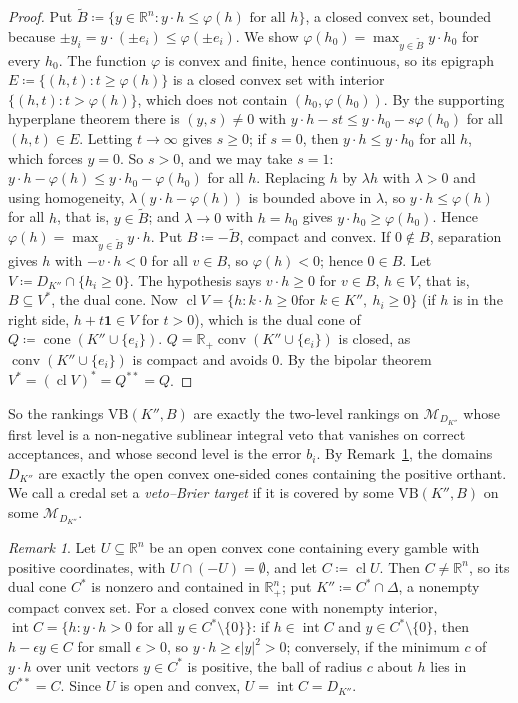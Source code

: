 \documentclass[11pt]{article}
\newcommand{\R}{\mathbb{R}}
\newcommand{\one}{\mathbf{1}}
\newcommand{\M}{\mathcal{M}}
\newcommand{\VB}{\mathrm{VB}}
\DeclareMathOperator{\conv}{conv}
\DeclareMathOperator{\cone}{cone}
\DeclareMathOperator{\cl}{cl}
\DeclareMathOperator{\inter}{int}
\theoremstyle{plain}
\theoremstyle{definition}
\theoremstyle{remark}
\newtheorem{remark}[theorem]{Remark}
\begin{document}
\begin{proof}
Put $\tilde B\coloneqq\{y\in\R^n:y\cdot h\le\varphi(h)\text{ for all }h\}$, a closed
convex set, bounded because $\pm y_i=y\cdot(\pm e_i)\le\varphi(\pm e_i)$. We show
$\varphi(h_0)=\max_{y\in\tilde B}y\cdot h_0$ for every $h_0$. The function $\varphi$ is
convex and finite, hence continuous, so its epigraph $E\coloneqq\{(h,t):t\ge\varphi(h)\}$
is a closed convex set with interior $\{(h,t):t>\varphi(h)\}$, which does not contain
$(h_0,\varphi(h_0))$. By the supporting hyperplane theorem \cite[Thm.~11.6]{Rockafellar}
there is $(y,s)\ne0$ with $y\cdot h-st\le y\cdot h_0-s\varphi(h_0)$ for all $(h,t)\in E$.
Letting $t\to\infty$ gives $s\ge0$; if $s=0$, then $y\cdot h\le y\cdot h_0$ for all $h$,
which forces $y=0$. So $s>0$, and we may take $s=1$: $y\cdot h-\varphi(h)\le y\cdot
h_0-\varphi(h_0)$ for all $h$. Replacing $h$ by $\lambda h$ with $\lambda>0$ and using
homogeneity, $\lambda(y\cdot h-\varphi(h))$ is bounded above in $\lambda$, so $y\cdot
h\le\varphi(h)$ for all $h$, that is, $y\in\tilde B$; and $\lambda\to0$ with $h=h_0$
gives $y\cdot h_0\ge\varphi(h_0)$. Hence $\varphi(h)=\max_{y\in\tilde B}y\cdot h$.
Put $B\coloneqq-\tilde B$, compact and convex. If $0\notin B$, separation
gives $h$ with $-v\cdot h<0$ for all $v\in B$, so $\varphi(h)<0$; hence $0\in B$. Let
$V\coloneqq D_{K''}\cap\{h_i\ge0\}$. The hypothesis says $v\cdot h\ge0$ for $v\in B$,
$h\in V$, that is, $B\subseteq V^\ast$, the dual cone. Now $\cl V=\{h:k\cdot h\ge0\text{
for }k\in K'',\ h_i\ge0\}$ (if $h$ is in the right side, $h+t\one\in V$ for $t>0$), which
is the dual cone of $Q\coloneqq\cone(K''\cup\{e_i\})$. $Q=\R_+\conv(K''\cup\{e_i\})$ is
closed, as $\conv(K''\cup\{e_i\})$ is compact and avoids $0$. By the bipolar theorem
$V^\ast=(\cl V)^\ast=Q^{\ast\ast}=Q$.
\end{proof}

So the rankings $\VB(K'',B)$ are exactly the two-level rankings on $\M_{D_{K''}}$ whose
first level is a non-negative sublinear integral veto that vanishes on correct
acceptances, and whose second level is the error $b_i$. By Remark~\ref{rem:convexU}, the
domains $D_{K''}$ are exactly the open convex one-sided cones containing the positive
orthant. We call a credal set a \emph{veto--Brier target} if it is covered by some
$\VB(K'',B)$ on some $\M_{D_{K''}}$.

\begin{remark}\label{rem:convexU}
Let $U\subseteq\R^n$ be an open convex cone containing every gamble with positive
coordinates, with $U\cap(-U)=\emptyset$, and let $C\coloneqq\cl U$. Then $C\neq\R^n$, so
its dual cone $C^\ast$ is nonzero and contained in $\R^n_+$; put $K''\coloneqq C^\ast\cap
\Delta$, a nonempty compact convex set. For a closed convex cone with nonempty interior,
$\inter C=\{h:y\cdot h>0\text{ for all }y\in C^\ast\setminus\{0\}\}$: if $h\in\inter C$ and
$y\in C^\ast\setminus\{0\}$, then $h-\epsilon y\in C$ for small $\epsilon>0$, so $y\cdot
h\ge\epsilon|y|^2>0$; conversely, if the minimum $c$ of $y\cdot h$ over unit vectors $y\in
C^\ast$ is positive, the ball of radius $c$ about $h$ lies in $C^{\ast\ast}=C$. Since $U$
is open and convex, $U=\inter C=D_{K''}$.
\end{remark}
\end{document}
